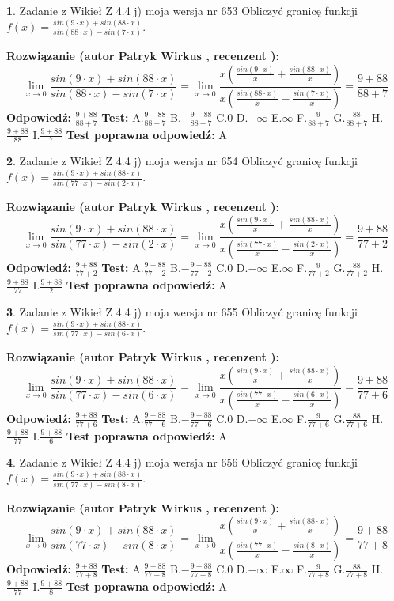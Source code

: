 \documentclass[12pt, a4paper]{article}
\theoremstyle{definition} %
\newtheorem{zad}{}
\newcommand{\zadStart}[1]{\begin{zad}#1\newline}
\newcommand{\zadStop}{\end{zad}}
\newcommand{\rozwStart}[2]{\noindent \textbf{Rozwiązanie (autor #1 , recenzent #2): }\newline}
\newcommand{\rozwStop}{\newline}
\newcommand{\odpStart}{\noindent \textbf{Odpowiedź:}\newline}
\newcommand{\odpStop}{\newline}
\newcommand{\testStart}{\noindent \textbf{Test:}\newline}
\newcommand{\testStop}{\newline}
\newcommand{\kluczStart}{\noindent \textbf{Test poprawna odpowiedź:}\newline}
\newcommand{\kluczStop}{\newline}
\begin{document}
\zadStart{Zadanie z Wikieł Z 4.4 j) moja wersja nr 653}
Obliczyć granicę funkcji $f(x)=\frac{sin(9\cdot x) +sin(88\cdot x)}{sin(88\cdot x) -sin(7\cdot x)}$.
\zadStop
\rozwStart{Patryk Wirkus}{}
$$\lim\limits_{x\to 0}\frac{sin(9\cdot x) +sin(88\cdot x)}{sin(88\cdot x) -sin(7\cdot x)}=\lim\limits_{x\to 0}\frac{x(\frac{sin(9\cdot x)}{x}+\frac{sin(88\cdot x)}{x})}{x(\frac{sin(88\cdot x)}{x}-\frac{sin(7\cdot x)}{x})}=\frac{9+88}{88+7}$$
\rozwStop
\odpStart
$\frac{9+88}{88+7}$
\odpStop
\testStart
A.$\frac{9+88}{88+7}$
B.$-\frac{9+88}{88+7}$
C.$0$
D.$-\infty$
E.$\infty$
F.$\frac{9}{88+7}$
G.$\frac{88}{88+7}$
H.$\frac{9+88}{88}$
I.$\frac{9+88}{7}$
\testStop
\kluczStart
A
\kluczStop



\zadStart{Zadanie z Wikieł Z 4.4 j) moja wersja nr 654}
Obliczyć granicę funkcji $f(x)=\frac{sin(9\cdot x) +sin(88\cdot x)}{sin(77\cdot x) -sin(2\cdot x)}$.
\zadStop
\rozwStart{Patryk Wirkus}{}
$$\lim\limits_{x\to 0}\frac{sin(9\cdot x) +sin(88\cdot x)}{sin(77\cdot x) -sin(2\cdot x)}=\lim\limits_{x\to 0}\frac{x(\frac{sin(9\cdot x)}{x}+\frac{sin(88\cdot x)}{x})}{x(\frac{sin(77\cdot x)}{x}-\frac{sin(2\cdot x)}{x})}=\frac{9+88}{77+2}$$
\rozwStop
\odpStart
$\frac{9+88}{77+2}$
\odpStop
\testStart
A.$\frac{9+88}{77+2}$
B.$-\frac{9+88}{77+2}$
C.$0$
D.$-\infty$
E.$\infty$
F.$\frac{9}{77+2}$
G.$\frac{88}{77+2}$
H.$\frac{9+88}{77}$
I.$\frac{9+88}{2}$
\testStop
\kluczStart
A
\kluczStop



\zadStart{Zadanie z Wikieł Z 4.4 j) moja wersja nr 655}
Obliczyć granicę funkcji $f(x)=\frac{sin(9\cdot x) +sin(88\cdot x)}{sin(77\cdot x) -sin(6\cdot x)}$.
\zadStop
\rozwStart{Patryk Wirkus}{}
$$\lim\limits_{x\to 0}\frac{sin(9\cdot x) +sin(88\cdot x)}{sin(77\cdot x) -sin(6\cdot x)}=\lim\limits_{x\to 0}\frac{x(\frac{sin(9\cdot x)}{x}+\frac{sin(88\cdot x)}{x})}{x(\frac{sin(77\cdot x)}{x}-\frac{sin(6\cdot x)}{x})}=\frac{9+88}{77+6}$$
\rozwStop
\odpStart
$\frac{9+88}{77+6}$
\odpStop
\testStart
A.$\frac{9+88}{77+6}$
B.$-\frac{9+88}{77+6}$
C.$0$
D.$-\infty$
E.$\infty$
F.$\frac{9}{77+6}$
G.$\frac{88}{77+6}$
H.$\frac{9+88}{77}$
I.$\frac{9+88}{6}$
\testStop
\kluczStart
A
\kluczStop



\zadStart{Zadanie z Wikieł Z 4.4 j) moja wersja nr 656}
Obliczyć granicę funkcji $f(x)=\frac{sin(9\cdot x) +sin(88\cdot x)}{sin(77\cdot x) -sin(8\cdot x)}$.
\zadStop
\rozwStart{Patryk Wirkus}{}
$$\lim\limits_{x\to 0}\frac{sin(9\cdot x) +sin(88\cdot x)}{sin(77\cdot x) -sin(8\cdot x)}=\lim\limits_{x\to 0}\frac{x(\frac{sin(9\cdot x)}{x}+\frac{sin(88\cdot x)}{x})}{x(\frac{sin(77\cdot x)}{x}-\frac{sin(8\cdot x)}{x})}=\frac{9+88}{77+8}$$
\rozwStop
\odpStart
$\frac{9+88}{77+8}$
\odpStop
\testStart
A.$\frac{9+88}{77+8}$
B.$-\frac{9+88}{77+8}$
C.$0$
D.$-\infty$
E.$\infty$
F.$\frac{9}{77+8}$
G.$\frac{88}{77+8}$
H.$\frac{9+88}{77}$
I.$\frac{9+88}{8}$
\testStop
\kluczStart
A
\kluczStop
\end{document}
